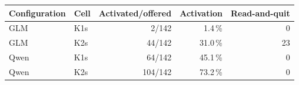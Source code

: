 \begin{tabular}{@{}llrrr@{}}
  \toprule
  Configuration & Cell & Activated/offered & Activation & Read-and-quit \\
  \midrule
  GLM & K1s & 2/142 & 1.4\,\% & 0 \\
  \rowcolor{black!6} GLM & K2s & 44/142 & 31.0\,\% & 23 \\
  Qwen & K1s & 64/142 & 45.1\,\% & 0 \\
  \rowcolor{black!6} Qwen & K2s & 104/142 & 73.2\,\% & 0 \\
  \bottomrule
\end{tabular}
